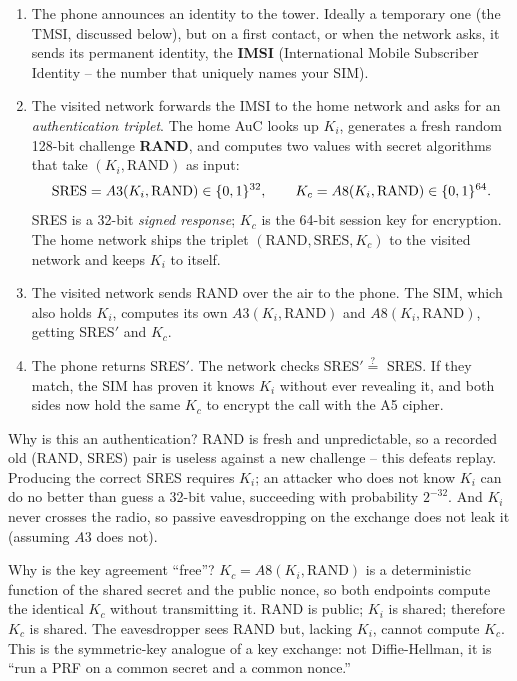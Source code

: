 \begin{enumerate}
  \item The phone announces an identity to the tower. Ideally a temporary one (the TMSI, discussed below), but on a first contact, or when the network asks, it sends its permanent identity, the \textbf{IMSI} (International Mobile Subscriber Identity -- the number that uniquely names your SIM).
  \item The visited network forwards the IMSI to the home network and asks for an \emph{authentication triplet}. The home AuC looks up $K_i$, generates a fresh random 128-bit challenge \textbf{RAND}, and computes two values with secret algorithms that take $(K_i, \text{RAND})$ as input:
  \[
    \text{SRES} = A3(K_i, \text{RAND}) \in \{0,1\}^{32},
    \qquad
    K_c = A8(K_i, \text{RAND}) \in \{0,1\}^{64}.
  \]
  SRES is a 32-bit \emph{signed response}; $K_c$ is the 64-bit session key for encryption. The home network ships the triplet $(\text{RAND}, \text{SRES}, K_c)$ to the visited network and keeps $K_i$ to itself.
  \item The visited network sends RAND over the air to the phone. The SIM, which also holds $K_i$, computes its own $A3(K_i,\text{RAND})$ and $A8(K_i,\text{RAND})$, getting SRES$'$ and $K_c$.
  \item The phone returns SRES$'$. The network checks SRES$' \stackrel{?}{=}$ SRES. If they match, the SIM has proven it knows $K_i$ without ever revealing it, and both sides now hold the same $K_c$ to encrypt the call with the A5 cipher.
\end{enumerate}

\begin{whybox}
Why is this an authentication? RAND is fresh and unpredictable, so a recorded old (RAND, SRES) pair is useless against a new challenge -- this defeats replay. Producing the correct SRES requires $K_i$; an attacker who does not know $K_i$ can do no better than guess a 32-bit value, succeeding with probability $2^{-32}$. And $K_i$ never crosses the radio, so passive eavesdropping on the exchange does not leak it (assuming $A3$ does not).

Why is the key agreement ``free''? $K_c = A8(K_i,\text{RAND})$ is a deterministic function of the shared secret and the public nonce, so both endpoints compute the identical $K_c$ without transmitting it. RAND is public; $K_i$ is shared; therefore $K_c$ is shared. The eavesdropper sees RAND but, lacking $K_i$, cannot compute $K_c$. This is the symmetric-key analogue of a key exchange: not Diffie-Hellman, it is ``run a PRF on a common secret and a common nonce.''
\end{whybox}

